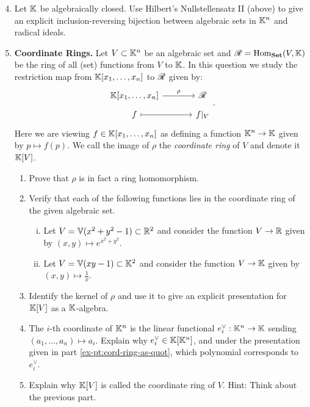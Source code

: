 \documentclass[12pt,reqno]{amsart}
\begin{document}
 \hrulefill

\begin{enumerate}[leftmargin=*]
  \setcounter{enumi}{3}

\item Let $\mathbb{K}$ be algebraically closed. Use Hilbert's Nullstellensatz II (above) to give an explicit inclusion-reversing bijection between algebraic sets in $\mathbb{K}^n$ and radical ideals. 

\item \textbf{Coordinate Rings.} Let $V \subset \mathbb{K}^n$ be an algebraic set and $\mathcal{R} = \operatorname{Hom}_{\operatorname{\textbf{Set}}}(V,\mathbb{K})$ be the ring of all (set) functions from $V$ to $\mathbb{K}$. In this question we study the restriction map from $\mathbb{K}[x_1,\ldots,x_n]$ to $\mathcal{R}$ given by:
\[
\begin{tikzcd}[column sep = 3.5em, row sep = .5em]
\KK[x_1,\ldots,x_n] \arrow[r, "\rho"] & \cR\\
f \arrow[r, mapsto] & f|_{V}
\end{tikzcd}.
\]
Here we are viewing $f \in \mathbb{K}[x_1,\ldots,x_n]$ as defining a function $\mathbb{K}^n \to \mathbb{K}$ given by $p \mapsto f(p)$. We call the image of $\rho$ the \emph{coordinate ring} of $V$ and denote it $\mathbb{K}[V]$. 
 \begin{enumerate}[label=(\alph*),ref=\theenumi\alph*]
 	\item Prove that $\rho$ is in fact a ring homomorphism. 
	\item Verify that each of the following functions lies in the coordinate ring of the given algebraic set. 
	\begin{enumerate}[(i)]
		\item Let $V = \mathbb{V}(x^2+y^2-1) \subset \mathbb{R}^2$ and consider the function $V \to \mathbb{R}$ given by $(x,y)\mapsto e^{x^2+y^2}$.
		\item Let $V = \mathbb{V}(xy-1) \subset \mathbb{K}^{2}$ and consider the function $V\to \mathbb{K}$ given by $(x,y) \mapsto \frac{1}{x}$. 
	\end{enumerate}
	\item\label{ex-pt:cord-ring-as-quot} Identify the kernel of $\rho$ and use it to give an explicit presentation for $\mathbb{K}[V]$ as a $\mathbb{K}$-algebra.
	\item The $i$-th coordinate of $\mathbb{K}^n$ is the linear functional $e_i^\vee: \mathbb{K}^n \to \mathbb{K}$ sending $(a_1,\ldots,a_n) \mapsto a_i$. Explain why $e_i^{\vee} \in \mathbb{K}[\mathbb{K}^n]$, and under the presentation given in part \ref{ex-pt:cord-ring-as-quot},  which polynomial corresponds to $e_i^{\vee}$. 
	\item Explain why $\mathbb{K}[V]$ is called the coordinate ring of $V$. Hint: Think about the previous part.

\end{enumerate}
\end{enumerate}
\end{document}
